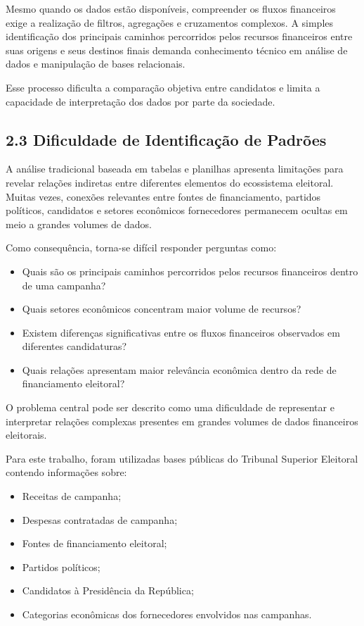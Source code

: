 \documentclass[11pt]{article}
\providecommand{\tightlist}{%
      \setlength{\itemsep}{0pt}\setlength{\parskip}{0pt}}
\begin{document}
Mesmo quando os dados estão disponíveis, compreender os fluxos
financeiros exige a realização de filtros, agregações e cruzamentos
complexos. A simples identificação dos principais caminhos percorridos
pelos recursos financeiros entre suas origens e seus destinos finais
demanda conhecimento técnico em análise de dados e manipulação de bases
relacionais.

Esse processo dificulta a comparação objetiva entre candidatos e limita
a capacidade de interpretação dos dados por parte da sociedade.

\subsection{2.3 Dificuldade de Identificação de
Padrões}\label{dificuldade-de-identificauxe7uxe3o-de-padruxf5es}

A análise tradicional baseada em tabelas e planilhas apresenta
limitações para revelar relações indiretas entre diferentes elementos do
ecossistema eleitoral. Muitas vezes, conexões relevantes entre fontes de
financiamento, partidos políticos, candidatos e setores econômicos
fornecedores permanecem ocultas em meio a grandes volumes de dados.

Como consequência, torna-se difícil responder perguntas como:

\begin{itemize}
\tightlist
\item
  Quais são os principais caminhos percorridos pelos recursos
  financeiros dentro de uma campanha?
\item
  Quais setores econômicos concentram maior volume de recursos?
\item
  Existem diferenças significativas entre os fluxos financeiros
  observados em diferentes candidaturas?
\item
  Quais relações apresentam maior relevância econômica dentro da rede de
  financiamento eleitoral?
\end{itemize}

O problema central pode ser descrito como uma dificuldade de representar
e interpretar relações complexas presentes em grandes volumes de dados
financeiros eleitorais.

Para este trabalho, foram utilizadas bases públicas do Tribunal Superior
Eleitoral contendo informações sobre:

\begin{itemize}
\tightlist
\item
  Receitas de campanha;
\item
  Despesas contratadas de campanha;
\item
  Fontes de financiamento eleitoral;
\item
  Partidos políticos;
\item
  Candidatos à Presidência da República;
\item
  Categorias econômicas dos fornecedores envolvidos nas campanhas.
\end{itemize}
\end{document}
